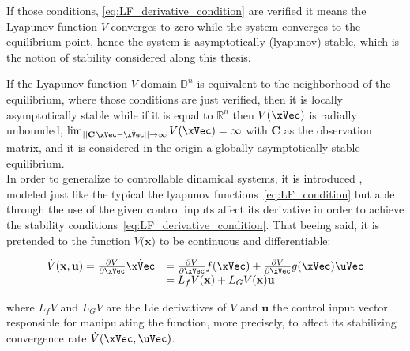 If those conditions, \eqref{eq:LF_derivative_condition} are verified it means the Lyapunov function \(V\) converges to zero while the system converges to the equilibrium point, hence the system is asymptotically (lyapunov) stable, which is the notion of stability considered along this thesis.\par
If the Lyapunov function \(V\) domain \(\mathbb{D}^n\) is equivalent to the neighborhood of the equilibrium, where those conditions are just verified, then it is locally asymptotically stable while if it is equal to \(\mathbb{R}^n\) then \(V(\xVec)\) is radially unbounded, \(\lim_{||\mathbf{C}\hspace{0.1em}\xVec - \bar{\xVec}||\to \infty}V(\xVec) = \infty\) with \(\mathbf{C}\) as the observation matrix, and it is considered in the origin a globally asymptotically stable equilibrium. \\

In order to generalize to controllable dinamical systems, it is introduced , modeled just like the typical the lyapunov functions~\eqref{eq:LF_condition} but able through the use of the given control inputs affect its derivative in order to achieve the stability conditions~\eqref{eq:LF_derivative_condition}. That beeing said, it is pretended to the  function \( V\mathbf(\mathbf{x}) \) to be continuous and differentiable:

\begin{equation}
\begin{array}{ll}
    \dot{V} (\mathbf{x}, \mathbf{u}) = \frac{\partial V}{\partial \xVec}\dot{\xVec} &= \frac{\partial V}{\partial \xVec}f(\xVec) + \frac{\partial V}{\partial \xVec}g(\xVec)\uVec \\
                                     &=  L_fV(\mathbf{x}) + L_GV(\mathbf{x})\mathbf{u}
\end{array}
\label{eq:CLF_derivative}
\end{equation}

where \(L_fV\) and \(L_GV\) are the Lie derivatives of \(V\) and \(\mathbf{u}\) the control input vector responsible for manipulating the function, more precisely, to affect its stabilizing convergence rate \(\dot{V}(\xVec, \uVec)\).\par

